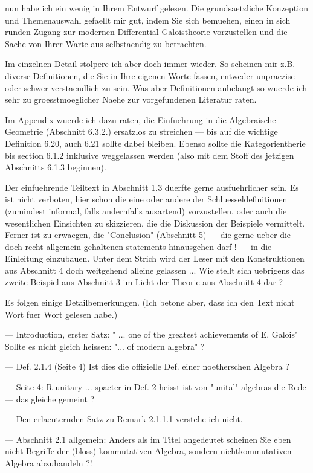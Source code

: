 nun habe ich ein wenig in Ihrem Entwurf gelesen. Die grundsaetzliche
Konzeption und Themenauswahl gefaellt mir gut, indem Sie sich bemuehen,
einen in sich runden Zugang zur modernen Differential-Galoistheorie
vorzustellen und die Sache von Ihrer Warte aus selbstaendig zu betrachten.

Im einzelnen Detail stolpere ich aber doch immer wieder. So scheinen mir
z.B. diverse Definitionen, die Sie in Ihre eigenen Worte fassen, entweder
unpraezise oder schwer verstaendlich zu sein. Was aber Definitionen
anbelangt so wuerde ich sehr zu groesstmoeglicher Naehe zur vorgefundenen
Literatur raten.

Im Appendix wuerde ich dazu raten, die Einfuehrung in die Algebraische
Geometrie (Abschnitt 6.3.2.) ersatzlos zu streichen --- bis auf die
wichtige Definition 6.20, auch 6.21 sollte dabei bleiben. Ebenso sollte
die Kategorientherie bis section 6.1.2 inklusive weggelassen werden (also
mit dem Stoff des jetzigen Abschnitts 6.1.3 beginnen).

Der einfuehrende Teiltext in Abschnitt 1.3 duerfte gerne ausfuehrlicher
sein. Es ist nicht verboten, hier schon die eine oder andere der
Schluesseldefinitionen (zumindest informal, falls andernfalls ausartend)
vorzustellen, oder auch die wesentlichen Einsichten zu skizzieren, die die
Diskussion der Beispiele vermittelt. Ferner ist zu erwaegen, die
"Conclusion" (Abschnitt 5) --- die gerne ueber die doch recht allgemein
gehaltenen statements hinausgehen darf ! --- in die Einleitung einzubauen.
Unter dem Strich wird der Leser mit den Konstruktionen aus Abschnitt 4
doch weitgehend alleine gelassen ... Wie stellt sich uebrigens das zweite
Beispiel aus Abschnitt 3 im Licht der Theorie aus Abschnitt 4 dar ?

Es folgen einige Detailbemerkungen. (Ich betone aber, dass ich den Text
nicht Wort fuer Wort gelesen habe.)

--- Introduction, erster Satz: " ... one of the greatest achievements of
E. Galois" Sollte es nicht gleich heissen: "... of modern algebra" ?

--- Def. 2.1.4 (Seite 4) Ist dies die offizielle Def. einer noetherschen
Algebra ?

--- Seite 4: R unitary ... spaeter in Def. 2 heisst ist von "unital"
algebras die Rede --- das gleiche gemeint ?

--- Den erlaeuternden Satz zu Remark 2.1.1.1 verstehe ich nicht.

--- Abschnitt 2.1 allgemein: Anders als im Titel angedeutet scheinen Sie
eben nicht Begriffe der (bloss) kommutativen Algebra, sondern
nichtkommutativen Algebra abzuhandeln ?!

